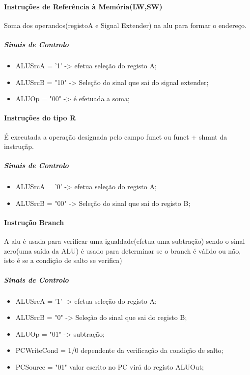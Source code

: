\documentclass[10pt,a4paper]{book}
\begin{document}
			\paragraph{Instruções de Referência à Memória(LW,SW)}

			Soma dos operandos(registoA e Signal Extender) na alu para formar o endereço.

			\subparagraph{Sinais de Controlo}

			\begin{itemize}
				\item ALUSrcA = '1' -> efetua seleção do registo A;
				\item ALUSrcB = "10" -> Seleção do sinal que sai do signal extender;
				\item ALUOp = "00" -> é efetuada a soma;
			\end{itemize}



			\paragraph{Instruções do tipo R}

			É executada a operação designada pelo campo funct ou funct + shmnt da instruçãp.

			\subparagraph{Sinais de Controlo}

			\begin{itemize}
				\item ALUSrcA = '0' -> efetua seleção do registo A;
				\item ALUSrcB = "00" -> Seleção do sinal que sai do registo B;
			\end{itemize}

			\paragraph{Instrução Branch}

			A alu é usada para verificar uma igualdade(efetua uma subtração) sendo o sinal zero(uma saída da ALU) é usado para determinar se o branch é válido ou não, isto é se a condição de salto se verifica)
			\subparagraph{Sinais de Controlo}

			\begin{itemize}
				\item ALUSrcA = '1' -> efetua seleção do registo A;
				\item ALUSrcB = "0" -> Seleção do sinal que sai do registo B;
				\item ALUOp = "01" -> subtração;
				\item PCWriteCond = 1/0 dependente da verificação da condição de salto;
				\item PCSource = "01" valor escrito no PC virá do registo ALUOut;

			\end{itemize}
\end{document}
